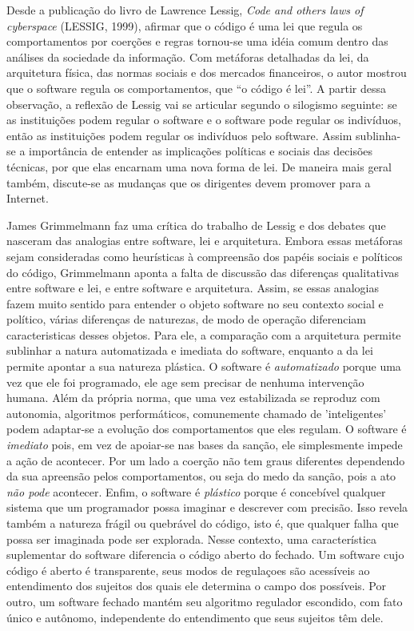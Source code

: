 Desde a publicação do livro de Lawrence Lessig, \emph{Code and others laws of cyberspace} (LESSIG, 1999), afirmar que o código é uma lei que regula os comportamentos por coerções e regras tornou-se uma idéia comum dentro das análises da sociedade da informação. Com metáforas detalhadas da lei, da arquitetura física, das normas sociais e dos mercados financeiros, o autor mostrou que o software regula os comportamentos, que “o código é lei”.  A partir dessa observação, a reflexão de Lessig vai se articular segundo o silogismo seguinte: se as instituições podem regular o software e o software pode regular os indivíduos, então as instituições podem regular os indivíduos pelo software. Assim sublinha-se a importância de entender as implicações políticas e sociais das decisões técnicas, por que elas encarnam uma nova forma de lei. De maneira mais geral também, discute-se as mudanças que os dirigentes devem promover para a Internet.

James Grimmelmann faz uma crítica do trabalho de Lessig e dos debates que nasceram das analogias entre software, lei e arquitetura. Embora essas metáforas sejam consideradas como heurísticas à compreensão dos papéis sociais e políticos do código, Grimmelmann aponta a falta de discussão das diferenças qualitativas entre software e lei, e entre software e arquitetura. Assim, se essas analogias fazem muito sentido para entender o objeto software no seu contexto social e político, várias diferenças de naturezas, de modo de operação diferenciam caracteristicas desses objetos. Para ele, a comparação com a arquitetura permite sublinhar a natura automatizada e imediata do software, enquanto a da lei permite apontar a sua natureza plástica. O software é \emph{automatizado} porque uma vez que ele foi programado, ele age sem precisar de nenhuma intervenção humana. Além da própria norma, que uma vez estabilizada se reproduz com autonomia, algoritmos performáticos, comunemente chamado de 'inteligentes' podem adaptar-se a evolução dos comportamentos que eles regulam. O software é \emph{imediato} pois, em vez de apoiar-se nas bases da sanção, ele simplesmente impede a ação de acontecer. Por um lado a coerção não tem graus diferentes dependendo da sua apreensão pelos comportamentos, ou seja do medo da sanção, pois a ato \emph{não pode} acontecer. Enfim, o software é \emph{plástico} porque é concebível qualquer sistema que um programador possa imaginar e descrever com precisão. Isso revela também a natureza frágil ou quebrável do código, isto é, que qualquer falha que possa ser imaginada pode ser explorada. Nesse contexto, uma característica suplementar do software diferencia o código aberto do fechado. Um software cujo código é aberto é transparente, seus modos de regulaçoes são acessíveis ao entendimento dos sujeitos dos quais ele determina o campo dos possíveis. Por outro, um software fechado mantém seu algoritmo regulador escondido, com fato único e autônomo, independente do entendimento que seus sujeitos têm dele.

